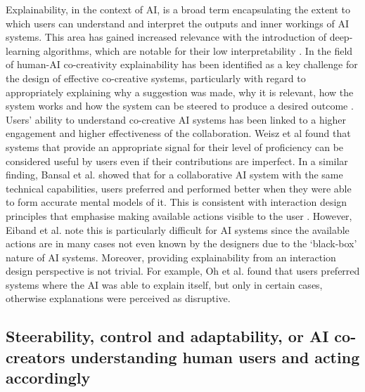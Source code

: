 Explainability, in the context of AI, is a broad term encapsulating the extent to which users can understand and interpret the outputs and inner workings of AI systems. This area has gained increased relevance with the introduction of deep-learning algorithms, which are notable for their low interpretability \cite{Linardatos2020-uq}. In the field of human-AI co-creativity explainability has been identified as a key challenge for the design of effective co-creative systems, particularly with regard to appropriately explaining why a suggestion was made, why it is relevant, how the system works and how the system can be steered to produce a desired outcome \cite{Zhu2018-yc}. Users’ ability to understand co-creative AI systems has been linked to a higher engagement and higher effectiveness of the collaboration. Weisz et al \cite{Weisz2021-iu} found that systems that provide an appropriate signal for their level of proficiency can be considered useful by users even if their contributions are imperfect. In a similar finding, Bansal et al. \cite{Bansal2019-mp} showed that for a collaborative AI system with the same technical capabilities, users preferred and performed better when they were able to form accurate mental models of it. This is consistent with interaction design principles that emphasise making available actions visible to the user \cite{Resnick2005-fs}. However, Eiband et al. \cite{Eiband2021-vj} note this is particularly difficult for AI systems since the available actions are in many cases not even known by the designers due to the ‘black-box’ nature of AI systems. Moreover, providing explainability from an interaction design perspective is not trivial. For example, Oh et al. found that users preferred systems where the AI was able to explain itself, but only in certain cases, otherwise explanations were perceived as disruptive. 

\subsection{Steerability, control and adaptability, or AI co-creators understanding human users and acting accordingly}

